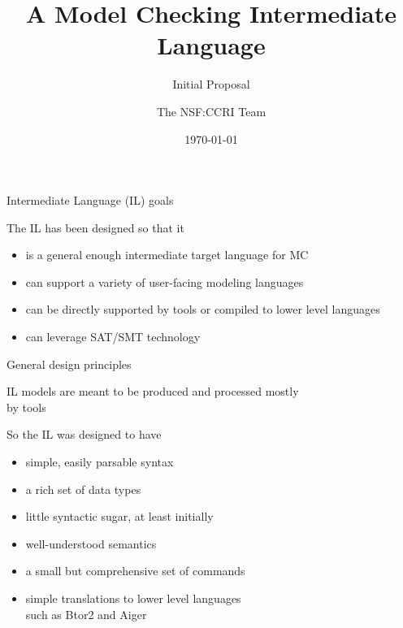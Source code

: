 \documentclass[10pt,aspectratio=149]{beamer}
\title{
{\LARGE A Model Checking Intermediate Language}
\\[1ex]
}
\subtitle{\Large Initial Proposal}
\author{\large The NSF:CCRI Team}
\date{\today}
\begin{document}


\begin{frame}
\titlepage

\end{frame}


\begin{frame}{Intermediate Language (IL)  goals}
\large 

The IL has been designed so that it
\bigskip

\begin{itemize}
\item
is a \alert{general enough} intermediate \alert{target language} for MC
\medskip

\item
can support a \alert{variety} of user-facing \alert{modeling languages}
\medskip

\item
can be \alert{directly supported} by tools or \alert{compiled} to lower level languages
\medskip

\item
can leverage SAT/SMT technology
\end{itemize}


\end{frame}


\begin{frame}{General design principles}
\large

IL models are meant to be \alert{produced and processed} mostly \\
\alert{by tools}
\bigskip
\medskip
\pause

So the IL was designed to have
\medskip


\begin{itemize}
\item<2,8> \alert{simple}, easily parsable \alert{syntax}
\item<3,8> a \alert{rich set} of \alert{data types}
\item<4,8> little syntactic sugar, at least initially
\item<5,8> \alert{well-understood semantics}
\item<6,8> a \alert{small} but comprehensive \alert{set of commands}
\item<7-> \alert{simple translations to lower level} languages \\
      such as Btor2 and Aiger
\end{itemize}


\end{frame}
\end{document}
